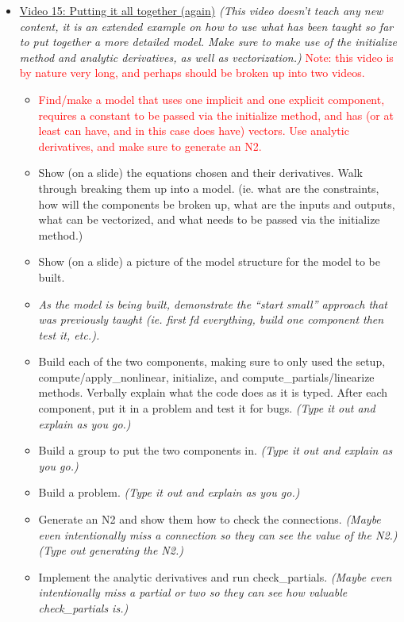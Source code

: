 \documentclass[12pt, letterpaper]{article}
\begin{document}
\begin{itemize}
	\item \underline{Video 15: Putting it all together (again)} \textit{(This video doesn’t teach any new content, it is an extended example on how to use what has been taught so far to put together a more detailed model. Make sure to make use of the initialize method and analytic derivatives, as well as vectorization.)} \textcolor{red}{Note: this video is by nature very long, and perhaps should be broken up into two videos.}
		\begin{itemize}
			\item \textcolor{red}{Find/make a model that uses one implicit and one explicit component, requires a constant to be passed via the initialize method, and has (or at least can have, and in this case does have) vectors. Use analytic derivatives, and make sure to generate an N2.}
			\item Show (on a slide) the equations chosen and their derivatives. Walk through breaking them up into a model. (ie. what are the constraints, how will the components be broken up, what are the inputs and outputs, what can be vectorized, and what needs to be passed via the initialize method.)
			\item Show (on a slide) a picture of the model structure for the model to be built.
			\item \textit{As the model is being built, demonstrate the ``start small'' approach that was previously taught (ie. first fd everything, build one component then test it, etc.).}
			\item Build each of the two components, making sure to only used the setup, compute/apply\_nonlinear, initialize, and compute\_partials/linearize methods. Verbally explain what the code does as it is typed. After each component, put it in a problem and test it for bugs. \textit{(Type it out and explain as you go.)}
			\item Build a group to put the two components in. \textit{(Type it out and explain as you go.)}
			\item Build a problem. \textit{(Type it out and explain as you go.)}
			\item Generate an N2 and show them how to check the connections. \textit{(Maybe even intentionally miss a connection so they can see the value of the N2.)} \textit{(Type out generating the N2.)}
			\item Implement the analytic derivatives and run check\_partials. \textit{(Maybe even intentionally miss a partial or two so they can see how valuable check\_partials is.)}

\end{itemize}
\end{itemize}
\end{document}
